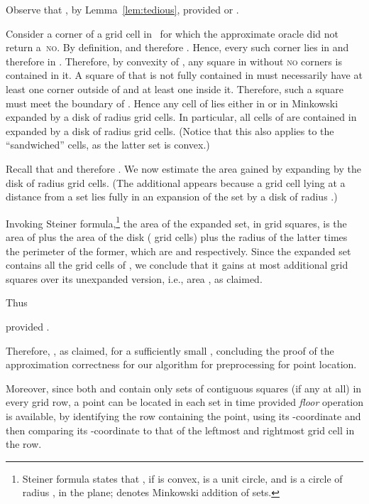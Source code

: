 \documentclass[11pt]{article}
\theoremstyle{remark}
\begin{document}
\begin{enumerate}[(i)]
Observe that , by Lemma~\ref{lem:tedious}, provided  or .

Consider a corner  of a grid cell in~ for which the approximate oracle did not return a~\textsc{no}. By definition,  and therefore . Hence, every such corner lies in  and therefore in .
Therefore, by convexity of , any square in  without \textsc{no} corners is contained in it.  A square of  that is not fully contained in  must necessarily have at least one corner outside of  and at least one inside it.  Therefore, such a square must meet the boundary of .  Hence any cell of  lies either in  or in  Minkowski expanded by a disk of radius  grid cells.  In particular, all cells of  are contained in  expanded by a disk of radius  grid cells.  (Notice that this also applies to the ``sandwiched'' cells, as the latter set is convex.)

Recall that  and therefore .  We now estimate the area gained by expanding  by the disk of radius  grid cells. 
(The additional  appears because a grid cell lying at a distance  from a set lies fully in an expansion of the set by a disk of radius .)

Invoking Steiner formula,\footnote{Steiner formula states that , if  is convex,  is a unit circle, and  is a circle of radius , in the plane;  denotes Minkowski addition of sets.}
 the area of the expanded set, in grid squares, is the area of  plus the area of the disk ( grid cells) plus the radius of the latter times the perimeter of the former, which are   and  respectively.  
Since the expanded set contains all the grid cells of , we 
conclude that it gains at most  additional grid squares over its unexpanded version, i.e., area , as claimed.

Thus 

provided .
\end{enumerate}

Therefore, , as claimed, for a sufficiently small ,
concluding the proof of the approximation correctness for our algorithm for preprocessing  for point location.

Moreover, since both  and  contain only sets of contiguous squares (if any at all) in every grid row, a point can be located in each set in  time provided \emph{floor} operation is available, by identifying the row containing the point, using its -coordinate and then comparing its -coordinate to that of the leftmost and rightmost grid cell in the row.
\end{document}
